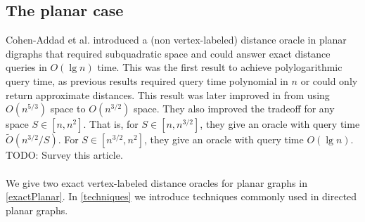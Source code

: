 \subsection{The planar case}
Cohen-Addad et al. \cite{cohen2017fast} introduced a (non vertex-labeled) distance
oracle in planar digraphs that required subquadratic space and could answer exact distance queries in
$O(\lg n)$ time. This was the first result to achieve polylogarithmic query time, as previous
results required query time polynomial in $n$ or could only return approximate distances.
This result was later improved in \cite{gawrychowski2017better} from using $O(n^{5/3})$
space to $O(n^{3/2})$ space. They also improved the tradeoff for any space $S\in [n,n^2]$.
That is, for $S\in [n, n^{3/2}]$, they give an oracle with query time
$\tilde{O}(n^{3/2}/S)$. For $S\in [n^{3/2}, n^2]$, they give an oracle with query time
$O(\lg n)$. TODO: Survey this article.\\
\\
We give two exact vertex-labeled distance oracles for planar graphs in \ref{exactPlanar}. In
\ref{techniques} we introduce techniques commonly used in directed planar graphs.

